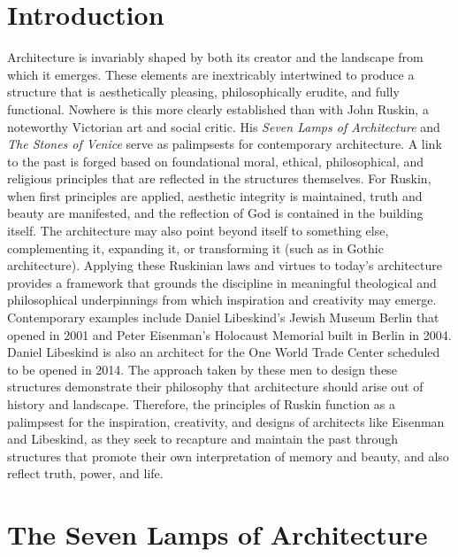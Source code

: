 \section{Introduction}
Architecture is invariably shaped by both its creator and the
landscape from which it emerges.  These elements are inextricably
intertwined to produce a structure that is aesthetically pleasing,
philosophically erudite, and fully functional.  Nowhere is this more
clearly established than with John Ruskin, a noteworthy Victorian art
and social critic.  His \textit{Seven Lamps of Architecture} and
\textit{The Stones of Venice} serve as palimpsests for contemporary
architecture.  A link to the past is forged based on foundational
moral, ethical, philosophical, and religious principles that are
reflected in the structures themselves.  For Ruskin, when first
principles are applied, aesthetic integrity is maintained, truth and
beauty are manifested, and the reflection of God is contained in the
building itself.  The architecture may also point beyond itself to
something else, complementing it, expanding it, or transforming it
(such as in Gothic architecture).  Applying these Ruskinian laws and
virtues to today’s architecture provides a framework that grounds the
discipline in meaningful theological and philosophical underpinnings
from which inspiration and creativity may emerge.  Contemporary
examples include Daniel Libeskind’s Jewish Museum Berlin that opened in
2001 and Peter Eisenman’s Holocaust Memorial built in Berlin in 2004. 
Daniel Libeskind is also an architect for the One World Trade Center
scheduled to be opened in 2014.  The approach taken by these men to
design these structures demonstrate their philosophy that architecture
should arise out of history and landscape.  Therefore, the principles
of Ruskin function as a palimpsest for the inspiration, creativity, and
designs of architects like Eisenman and Libeskind, as they seek to
recapture and maintain the past through structures that promote their
own interpretation of memory and beauty, and also reflect truth, power,
and life.

\section{The Seven Lamps of Architecture}

